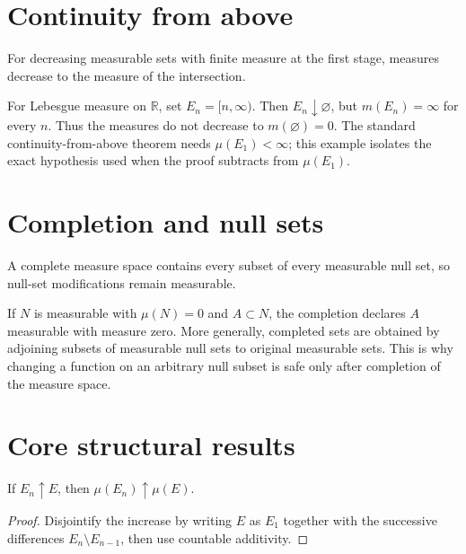 \section{Continuity from above}
For decreasing measurable sets with finite measure at the first stage, measures decrease to the measure of the intersection.


\begin{example}\label{ex:iii01-expand-02}
For Lebesgue measure on \(\mathbb R\), set \(E_n=[n,\infty)\). Then
\(E_n\downarrow\varnothing\), but \(m(E_n)=\infty\) for every \(n\).
Thus the measures do not decrease to \(m(\varnothing)=0\). The standard
continuity-from-above theorem needs \(\mu(E_1)<\infty\); this example isolates
the exact hypothesis used when the proof subtracts from \(\mu(E_1)\).
\end{example}
\section{Completion and null sets}
A complete measure space contains every subset of every measurable null set, so null-set modifications remain measurable.


\begin{example}\label{ex:iii01-expand-03}
If \(N\) is measurable with \(\mu(N)=0\) and \(A\subset N\), the completion
declares \(A\) measurable with measure zero. More generally, completed sets
are obtained by adjoining subsets of measurable null sets to original
measurable sets. This is why changing a function on an arbitrary null subset
is safe only after completion of the measure space.
\end{example}
\section{Core structural results}

\begin{theorem}\label{thm:iii01-01}
If $E_n\uparrow E$, then $\mu(E_n)\uparrow\mu(E)$.
\begin{proof}
Disjointify the increase by writing $E$ as $E_1$ together with the successive differences $E_n\setminus E_{n-1}$, then use countable additivity.
\end{proof}
\end{theorem}

